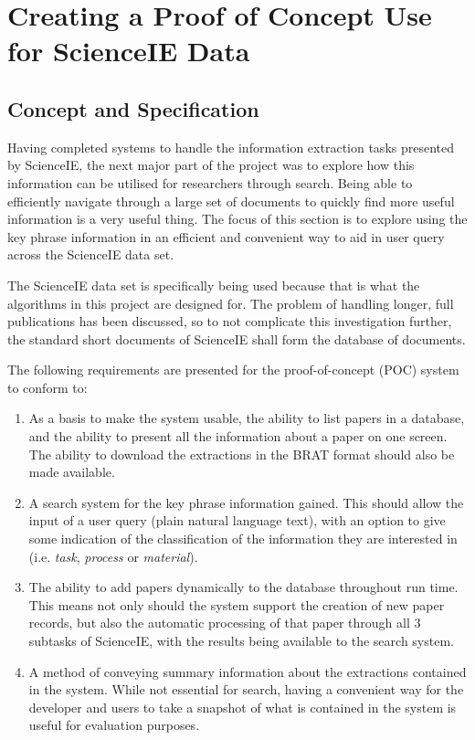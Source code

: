 \chapter{Creating a Proof of Concept Use for ScienceIE Data}
\section{Concept and Specification}
Having completed systems to handle the information extraction tasks presented by ScienceIE, the next major part of the project was to explore how this information can be utilised for researchers through search. Being able to efficiently navigate through a large set of documents to quickly find more useful information is a very useful thing. The focus of this section is to explore using the key phrase information in an efficient and convenient way to aid in user query across the ScienceIE data set. 

The ScienceIE data set is specifically being used because that is what the algorithms in this project are designed for. The problem of handling longer, full publications has been discussed, so to not complicate this investigation further, the standard short documents of ScienceIE shall form the database of documents.

The following requirements are presented for the proof-of-concept (POC) system to conform to:
\begin{enumerate}
	\item As a basis to make the system usable, the ability to list papers in a database, and the ability to present all the information about a paper on one screen. The ability to download the extractions in the BRAT format should also be made available. 
	\item A search system for the key phrase information gained. This should allow the input of a user query (plain natural language text), with an option to give some indication of the classification of the information they are interested in (i.e. \textit{task}, \textit{process} or \textit{material}).
	\item The ability to add papers dynamically to the database throughout run time. This means not only should the system support the creation of new paper records, but also the automatic processing of that paper through all 3 subtasks of ScienceIE, with the results being available to the search system.
	\item A method of conveying summary information about the extractions contained in the system. While not essential for search, having a convenient way for the developer and users to take a snapshot of what is contained in the system is useful for evaluation purposes.
\end{enumerate}

